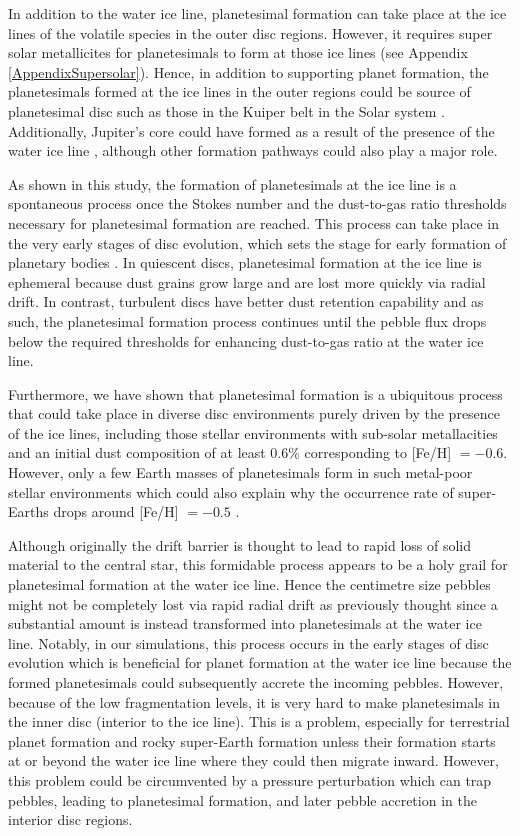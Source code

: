 \documentclass{aa}
\begin{document}
In addition to the water ice line, planetesimal formation can take place at the ice lines of the volatile species in the outer disc regions.  However, it requires super solar metallicites for planetesimals to form at those ice lines (see Appendix \ref{AppendixSupersolar}). Hence, in addition to supporting planet formation,  the planetesimals formed at the ice lines  in the outer regions could be source of planetesimal disc such as those in the Kuiper belt in the Solar system \citep[e.g.,][]{Eistrup2019}. Additionally, Jupiter's core could have formed as a result of the presence of the water ice line \citep{Walsh2011,Savvidou2021}, although other formation pathways could also play a major role.


As shown in this study, the  formation of planetesimals at the ice line is a spontaneous process once the Stokes number and the dust-to-gas ratio thresholds necessary for planetesimal formation are reached. This  process can take place in the very early stages of disc evolution, which sets the stage for early formation of planetary bodies \citep[e.g.][]{Manara2018, SavvidouBitsch2023}. In quiescent discs, planetesimal formation at the ice line is ephemeral because dust grains grow large and are lost more quickly via radial drift. In contrast, turbulent discs have better dust retention capability and as such, the planetesimal formation process continues until the pebble flux drops below the required thresholds for enhancing dust-to-gas ratio at the water ice line. 

Furthermore, we have shown that planetesimal formation is a ubiquitous process that could take place in diverse disc environments  purely driven by the presence of the ice lines, including those stellar environments with sub-solar metallacities and an initial dust composition of at least 0.6\% corresponding to [Fe/H] $= -0.6$. However, only a few Earth masses of planetesimals form in such metal-poor stellar environments which could also explain why the occurrence rate of super-Earths drops around [Fe/H] $= -0.5$ \citep{BashiZucker2022}.


Although originally the drift barrier is thought to lead to rapid loss of solid material to the central star, this formidable process appears to be a holy grail for planetesimal formation at the water ice line. Hence the centimetre size pebbles might not be completely lost via rapid radial drift as previously thought since a substantial amount is instead transformed into planetesimals at the water ice line. Notably, in our simulations, this process occurs in the early stages of disc evolution which is beneficial for planet formation at the water ice line because the formed planetesimals could subsequently accrete the incoming pebbles. However, because of the low fragmentation levels, it is very hard to make planetesimals in the inner disc (interior to the ice line). This is a problem, especially for terrestrial planet formation and rocky super-Earth formation unless their formation starts at or beyond the water ice line where they could then migrate inward. However, this problem could be circumvented by a pressure perturbation which can trap pebbles, leading to planetesimal formation, and later pebble accretion in the interior disc regions.
\end{document}

